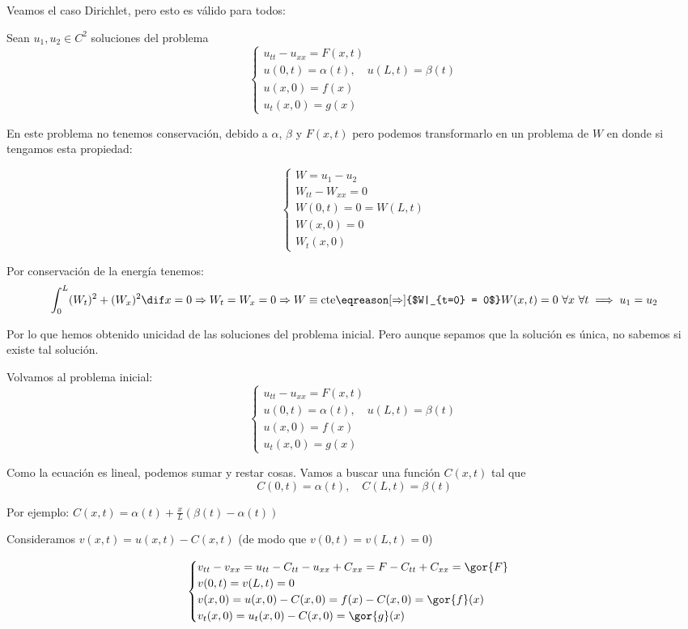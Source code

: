 			Veamos el caso Dirichlet, pero esto es válido para todos:

			Sean $u_1,u_2 \in C^2$ soluciones del problema
			\[ \begin{cases}
				u_{tt} - u_{xx} = F(x,t)\\
				u(0,t) = \alpha(t), \quad u(L,t) = \beta(t) \\
				u(x,0) = f(x) \\
				u_t(x,0) = g(x)
			\end{cases}\]

			En este problema no tenemos conservación, debido a $\alpha$, $\beta$ y $F(x,t)$ pero podemos transformarlo en un problema de $W$ en donde si tengamos esta propiedad:

			\[\begin{cases}
				W = u_1 - u_2 \\
				W_{tt} - W_{xx} = 0 \\
				W(0,t) = 0 = W(L,t) \\
				W(x,0) = 0 \\
				W_t(x,0)
			\end{cases}\]

			Por conservación de la energía tenemos:
			\[ \int_0^L (W_t)^2 + (W_x)^2 \dif x = 0 \Rightarrow W_t = W_x = 0 \Rightarrow W \equiv \text{cte} \eqreason[\Rightarrow]{$W|_{t=0} = 0$} W(x,t) = 0 \ \forall x\ \forall t \implies u_1 = u_2 \]

			Por lo que hemos obtenido unicidad de las soluciones del problema inicial. Pero aunque sepamos que la solución es única, no sabemos si existe tal solución.

			Volvamos al problema inicial:
			\[ \begin{cases}
				u_{tt} - u_{xx} = F(x,t)\\
				u(0,t) = \alpha(t), \quad u(L,t) = \beta(t) \\
				u(x,0) = f(x) \\
				u_t(x,0) = g(x)
			\end{cases}\]

			Como la ecuación es lineal, podemos sumar y restar cosas. Vamos a buscar una función $C(x,t)$ tal que
			\[ C(0,t) = \alpha(t), \quad C(L,t) = \beta(t) \]

			Por ejemplo: $C(x,t) = \alpha(t) + \frac{x}{L} (\beta(t)-\alpha(t))$

			Consideramos $v(x,t) = u(x,t) - C(x,t)$ (de modo que $v(0,t) = v(L,t) = 0$)

			\[\begin{cases}
				v_{tt} - v_{xx} = u_{tt} - C_{tt} - u_{xx} + C_{xx} = F - C_{tt} + C_{xx} = \gor{F} \\
				v(0,t) = v(L,t) = 0 \\
				v(x,0) = u(x,0) - C(x,0) = f(x) - C(x,0) = \gor{f}(x) \\
				v_t (x,0) = u_t(x,0) - C(x,0) = \gor{g}(x)
			\end{cases}
			\]


